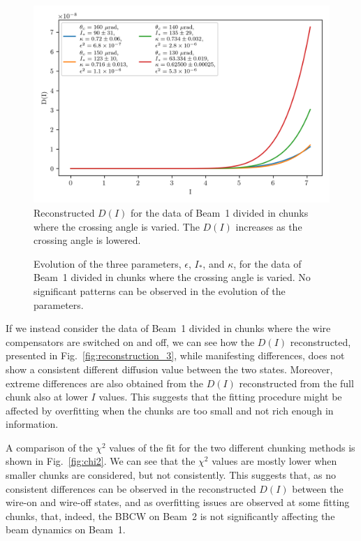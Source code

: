 \begin{figure}[hpt]
    \centering
    \includegraphics[width=1.0\textwidth]{5_wire_compensators_LHC/figs/fokker_planck_b1_D.png}
    \caption{Reconstructed $D(I)$ for the data of Beam~1 divided in chunks where the crossing angle is varied. The $D(I)$ increases as the crossing angle is lowered.}
    \label{fig:reconstruction_2}
\end{figure}

\begin{figure}[hpt]
    \centering
    \caption{Evolution of the three parameters, $\epsilon$, $I_\ast$, and $\kappa$, for the data of Beam~1 divided in chunks where the crossing angle is varied. No significant patterns can be observed in the evolution of the parameters.}
    \label{fig:parameters_1}
\end{figure}

If we instead consider the data of Beam~1 divided in chunks where the wire compensators are switched on and off, we can see how the $D(I)$ reconstructed, presented in Fig.~\ref{fig:reconstruction_3}, while manifesting differences, does not show a consistent different diffusion value between the two states. Moreover, extreme differences are also obtained from the $D(I)$ reconstructed from the full chunk also at lower $I$ values. This suggests that the fitting procedure might be affected by overfitting when the chunks are too small and not rich enough in information.

A comparison of the $\chi^2$ values of the fit for the two different chunking methods is shown in Fig.~\ref{fig:chi2}. We can see that the $\chi^2$ values are mostly lower when smaller chunks are considered, but not consistently. This suggests that, as no consistent differences can be observed in the reconstructed $D(I)$ between the wire-on and wire-off states, and as overfitting issues are observed at some fitting chunks, that, indeed, the BBCW on Beam~2 is not significantly affecting the beam dynamics on Beam~1.

